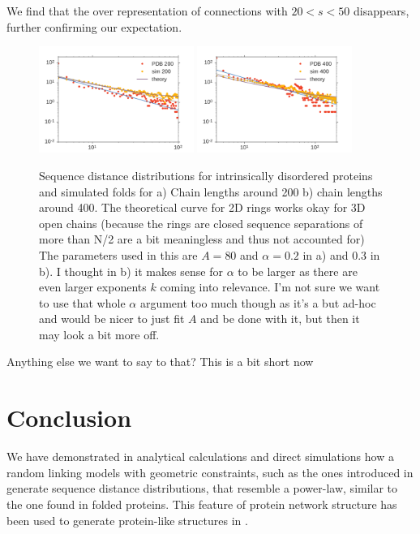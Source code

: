 \documentclass[reprint,amsmath,amssymb,rmp,onecolumn,notitlepage,11pt]{revtex4-1}
\newcommand{\red}[1]{\textcolor{red!80!black}{#1}}
\newcommand{\gray}[1]{\textcolor{gray!80!black}{#1}}
\begin{document}
\gray{We find that the over representation of connections with $20<s<50$ disappears, further confirming our expectation.}
\begin{figure}[h]
        \centering
	\includegraphics[width=0.45\textwidth]{figures/idp_200.pdf}
	\includegraphics[width=0.45\textwidth]{figures/idp_400.pdf}
        \caption{\gray{Sequence distance distributions for intrinsically disordered proteins and simulated folds for a) Chain lengths around 200 b) chain lengths around 400. The theoretical curve for 2D rings works okay for 3D open chains (because the rings are closed sequence separations of more than N/2 are a bit meaningless and thus not accounted for) The parameters used in this are $A=80$ and $\alpha=0.2$ in a) and $0.3$ in b). I thought in b) it makes sense for $\alpha$ to be larger as there are even larger exponents $k$ coming into relevance. I'm not sure we want to use that whole $\alpha$ argument too much though as it's a but ad-hoc and would be nicer to just fit $A$ and be done with it, but then it may look a bit more off.}
        }
        \label{fig:sdd_idp}
\end{figure}
\red{Anything else we want to say to that? This is a bit short now}
\section*{Conclusion}
We have demonstrated in analytical calculations and direct simulations how a random linking models with geometric constraints, such as the ones introduced in \cite{molkenthin2016scaling, molkenthin2020self} generate sequence distance distributions, that resemble a power-law, similar to the one found in folded proteins. This feature of protein network structure has been used to generate protein-like structures in \cite{bartoli2008effect}.
\end{document}
